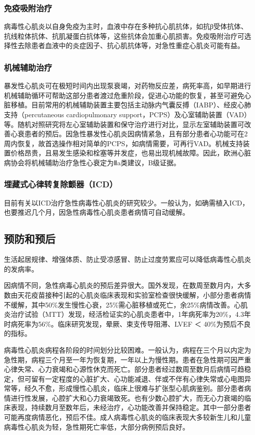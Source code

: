 \subsubsection{免疫吸附治疗}

病毒性心肌炎以自身免疫为主时，血液中存在多种抗心肌抗体，如抗β受体抗体、抗线粒体抗体、抗肌凝蛋白抗体等，这些抗体会加重心肌损害。免疫吸附治疗可选择性去除患者血液中的炎症因子、抗心肌抗体等，对急性重症心肌炎可能有益。

\subsubsection{机械辅助治疗}

暴发性心肌炎可在极短时间内出现泵衰竭，对药物反应差，病死率高，如早期进行机械辅助循环可帮助这部分患者渡过危重阶段，促进心功能的恢复，甚至可避免心脏移植。目前常用的机械辅助装置主要包括主动脉内气囊反搏（IABP）、经皮心肺支持（percutaneous
cardiopulmonary
support，PCPS）及心室辅助装置（VAD）等。随机对照研究将左心室辅助装置和保守治疗进行对比，显示左室辅助装置可改善心衰患者的预后。因急性暴发性心肌炎因病情紧急，且有部分患者心功能可在2周内恢复，故首选操作相对简单的PCPS，如病情需要，可再行VAD。机械支持装置价格昂贵，且易发生感染和栓塞等并发症，也易出现机械故障。因此，欧洲心脏病协会将机械辅助治疗急性心衰定为Ⅱa类建议，B级证据。

\subsubsection{埋藏式心律转复除颤器（ICD）}

目前有关以ICD治疗急性病毒性心肌炎的研究较少。一般认为，如确需植入ICD，也要推迟几个月，因急性病毒性心肌炎患者病情可自动缓解。

\subsection{预防和预后}

生活起居规律、增强体质、防止受凉感冒、防止过度劳累应可以降低病毒性心肌炎的发病率。

因病情不同，急性病毒心肌炎的预后差异很大。国外发现，在数周至数月内，大多数由天花疫苗接种引起的心肌炎临床表现和实验室检查很快缓解，小部分患者病情不缓解，其中50\%发生慢性心衰，25\%需心脏移植或死亡，余25\%病情改善。心肌炎治疗试验（MTT）发现，经活检证实的心肌炎患者中，1年病死率为20\%，4.3年时病死率为56\%。临床研究发现，晕厥、束支传导阻滞、LVEF
＜ 40\%为预后不良的指标。

病毒性心肌炎病程各阶段的时间划分比较困难。一般认为，病程在三个月以内定为急性期，病程三个月至一年为恢复期，一年以上为慢性期。患者在急性期可因严重心律失常、心力衰竭和心源性休克而死亡。部分患者经过数周至数月后病情可趋稳定，但可留有一定程度的心脏扩大、心功能减退、伴或不伴有心律失常或心电图异常等，经久不愈，形成慢性心肌炎，临床上很难与扩张型心肌病鉴别。部分患者病情进行性发展，心腔扩大和心力衰竭致死。也有少数心腔扩大，而无心力衰竭的临床表现，持续数月至数年后，未经治疗，心功能改善并保持稳定。其中一部分患者可能再度病情恶化，预后不佳。成人病毒性心肌炎的临床表现大多较新生儿和儿童病毒性心肌炎为轻，急性期死亡率低，大部分病例预后良好。

